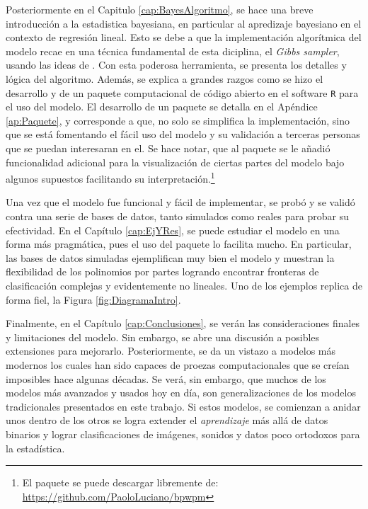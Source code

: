 \documentclass[../Main/Main.tex]{subfiles}
\begin{document}
Posteriormente en el Capitulo \ref{cap:BayesAlgoritmo}, se hace una breve introducción a la estadistica bayesiana, en particular al apredizaje bayesiano en el contexto de regresión lineal. Esto se debe a que la implementación algorítmica del modelo recae en una técnica fundamental de esta diciplina, el \textit{Gibbs sampler}, usando las ideas de \autocite{albert1993bayesian}. Con esta poderosa herramienta, se presenta los detalles y lógica del algoritmo. Además, se explica a grandes razgos como se hizo el desarrollo y de un paquete computacional de código abierto en el software \verb|R| para el uso del modelo. El desarrollo de un paquete se detalla en el Apéndice \ref{ap:Paquete}, y corresponde a que, no solo se simplifica la implementación, sino que se está fomentando el fácil uso del modelo y su validación a terceras personas que se puedan interesaran en el. Se hace notar, que al paquete se le añadió funcionalidad adicional para la visualización de ciertas partes del modelo bajo algunos supuestos facilitando su interpretación.\footnote{El paquete se puede descargar libremente de: \url{https://github.com/PaoloLuciano/bpwpm}}

Una vez que el modelo fue funcional y fácil de implementar, se probó y se validó contra una serie de bases de datos, tanto simulados como reales para probar su efectividad. En el Capítulo \ref{cap:EjYRes}, se puede estudiar el modelo en una forma más pragmática, pues el uso del paquete lo facilita mucho. En particular, las bases de datos simuladas ejemplifican muy bien el modelo y muestran la flexibilidad de los polinomios por partes logrando encontrar fronteras de clasificación complejas y evidentemente no lineales. Uno de los ejemplos replica de forma fiel, la Figura \ref{fig:DiagramaIntro}.

Finalmente, en el Capítulo \ref{cap:Conclusiones}, se verán las consideraciones finales y limitaciones del modelo. Sin embargo, se abre una discusión a posibles extensiones para mejorarlo. Posteriormente, se da un vistazo a modelos más modernos los cuales han sido capaces de proezas computacionales que se creían imposibles hace algunas décadas. Se verá, sin embargo, que muchos de los modelos más avanzados y usados hoy en día, son generalizaciones de los modelos tradicionales presentados en este trabajo. Si estos modelos, se comienzan a anidar unos dentro de los otros se logra extender el \textit{aprendizaje} más allá de datos binarios y lograr clasificaciones de imágenes, sonidos y datos poco ortodoxos para la estadística. 
\end{document}
